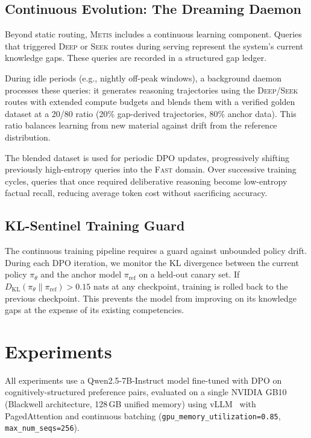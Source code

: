 \documentclass[11pt,a4paper]{article}
\newcommand{\metis}{\textsc{Metis}}
\begin{document}
\subsection{Continuous Evolution: The Dreaming Daemon}
\label{sec:dreaming}

Beyond static routing, \metis{} includes a continuous learning component. Queries that triggered \textsc{Deep} or \textsc{Seek} routes during serving represent the system's current knowledge gaps. These queries are recorded in a structured gap ledger.

During idle periods (e.g., nightly off-peak windows), a background daemon processes these queries: it generates reasoning trajectories using the \textsc{Deep}/\textsc{Seek} routes with extended compute budgets and blends them with a verified golden dataset at a 20/80 ratio (20\% gap-derived trajectories, 80\% anchor data). This ratio balances learning from new material against drift from the reference distribution.

The blended dataset is used for periodic DPO updates, progressively shifting previously high-entropy queries into the \textsc{Fast} domain. Over successive training cycles, queries that once required deliberative reasoning become low-entropy factual recall, reducing average token cost without sacrificing accuracy.

\subsection{KL-Sentinel Training Guard}
\label{sec:kl}

The continuous training pipeline requires a guard against unbounded policy drift. During each DPO iteration, we monitor the KL divergence between the current policy $\pi_\theta$ and the anchor model $\pi_{\text{ref}}$ on a held-out canary set. If $D_{\text{KL}}(\pi_\theta \| \pi_{\text{ref}}) > 0.15$ nats at any checkpoint, training is rolled back to the previous checkpoint. This prevents the model from improving on its knowledge gaps at the expense of its existing competencies.

\section{Experiments}
\label{sec:experiments}

All experiments use a Qwen2.5-7B-Instruct model fine-tuned with DPO on cognitively-structured preference pairs, evaluated on a single NVIDIA GB10 (Blackwell architecture, 128\,GB unified memory) using vLLM~\citep{kwon2023efficient} with PagedAttention and continuous batching (\texttt{gpu\_memory\_utilization=0.85}, \texttt{max\_num\_seqs=256}).
\end{document}
